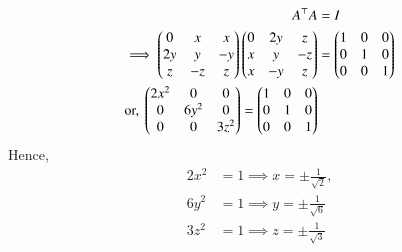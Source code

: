 \begin{align}
A^\top A&=I
\\
\implies \begin{pmatrix}0 & x & x\\2y & y & -y\\z & -z & z\end{pmatrix}\begin{pmatrix}0 & 2y & z\\x & y & -z\\x & -y & z\end{pmatrix} &= \begin{pmatrix}1 & 0 & 0\\0 & 1 & 0\\0 & 0 & 1\end{pmatrix}
\\
\text{or, } \begin{pmatrix}2x^2 & 0 & 0\\0 & 6y^2 & 0\\0 & 0 & 3z^2\end{pmatrix} = \begin{pmatrix}1 & 0 & 0\\0 & 1 & 0\\0 & 0 & 1\end{pmatrix}
\end{align}
Hence, 
\begin{align}
2x^2 &= 1 
\implies 
x = \pm\frac{1}{\sqrt{2}},
\\
6y^2 &= 1
\implies 
y = \pm\frac{1}{\sqrt{6}}
\\
3z^2 &= 1
\implies 
z = \pm\frac{1}{\sqrt{3}}
\end{align}